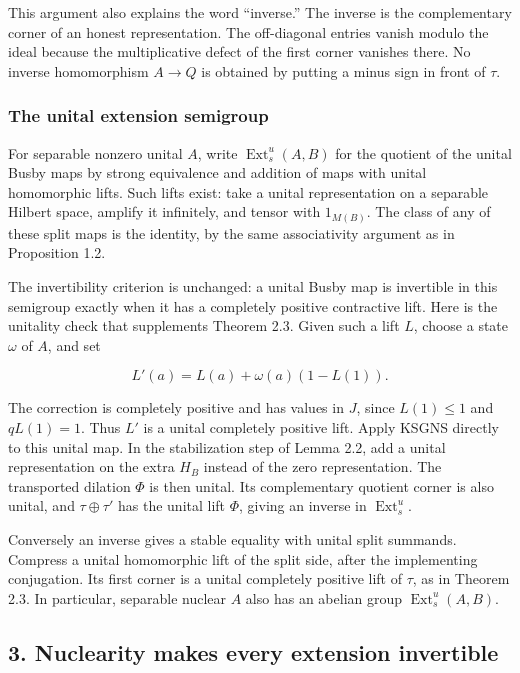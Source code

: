 \documentclass[
  11pt,
]{article}
\begin{document}
This argument also explains the word ``inverse.'' The inverse is the
complementary corner of an honest representation. The off-diagonal
entries vanish modulo the ideal because the multiplicative defect of the
first corner vanishes there. No inverse homomorphism \(A\to Q\) is
obtained by putting a minus sign in front of \(\tau\).

\subsubsection{The unital extension
semigroup}\label{the-unital-extension-semigroup}

For separable nonzero unital \(A\), write
\(\operatorname{Ext}_s^u(A,B)\) for the quotient of the unital Busby
maps by strong equivalence and addition of maps with unital homomorphic
lifts. Such lifts exist: take a unital representation on a separable
Hilbert space, amplify it infinitely, and tensor with \(1_{M(B)}\). The
class of any of these split maps is the identity, by the same
associativity argument as in Proposition 1.2.

The invertibility criterion is unchanged: a unital Busby map is
invertible in this semigroup exactly when it has a completely positive
contractive lift. Here is the unitality check that supplements Theorem
2.3. Given such a lift \(L\), choose a state \(\omega\) of \(A\), and
set

\[
L'(a)=L(a)+\omega(a)(1-L(1)).
\]

The correction is completely positive and has values in \(J\), since
\(L(1)\leq1\) and \(qL(1)=1\). Thus \(L'\) is a unital completely
positive lift. Apply KSGNS directly to this unital map. In the
stabilization step of Lemma 2.2, add a unital representation on the
extra \(H_B\) instead of the zero representation. The transported
dilation \(\Phi\) is then unital. Its complementary quotient corner is
also unital, and \(\tau\oplus\tau'\) has the unital lift \(\Phi\),
giving an inverse in \(\operatorname{Ext}_s^u\).

Conversely an inverse gives a stable equality with unital split
summands. Compress a unital homomorphic lift of the split side, after
the implementing conjugation. Its first corner is a unital completely
positive lift of \(\tau\), as in Theorem 2.3. In particular, separable
nuclear \(A\) also has an abelian group \(\operatorname{Ext}_s^u(A,B)\).

\subsection{3. Nuclearity makes every extension
invertible}\label{nuclearity-makes-every-extension-invertible}
\end{document}
